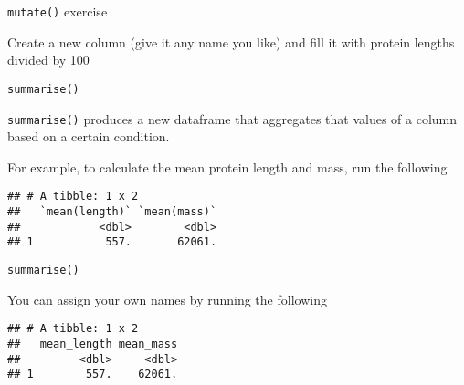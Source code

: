 \documentclass[ignorenonframetext,]{beamer}
\newenvironment{Shaded}{\begin{snugshade}}{\end{snugshade}}
\newcommand{\DataTypeTok}[1]{\textcolor[rgb]{0.13,0.29,0.53}{#1}}
\newcommand{\DecValTok}[1]{\textcolor[rgb]{0.00,0.00,0.81}{#1}}
\newcommand{\KeywordTok}[1]{\textcolor[rgb]{0.13,0.29,0.53}{\textbf{#1}}}
\newcommand{\NormalTok}[1]{#1}
\newcommand{\OperatorTok}[1]{\textcolor[rgb]{0.81,0.36,0.00}{\textbf{#1}}}
\newcommand{\StringTok}[1]{\textcolor[rgb]{0.31,0.60,0.02}{#1}}
\begin{document}
\begin{frame}[fragile]{\texttt{mutate()} exercise}
\protect\hypertarget{mutate-exercise}{}

Create a new column (give it any name you like) and fill it with protein
lengths divided by 100

\begin{Shaded}
\end{Shaded}

\end{frame}

\begin{frame}[fragile]{\texttt{summarise()}}
\protect\hypertarget{summarise}{}

\texttt{summarise()} produces a new dataframe that aggregates that
values of a column based on a certain condition.

For example, to calculate the mean protein length and mass, run the
following

\begin{Shaded}
\end{Shaded}

\begin{verbatim}
## # A tibble: 1 x 2
##   `mean(length)` `mean(mass)`
##            <dbl>        <dbl>
## 1           557.       62061.
\end{verbatim}

\end{frame}

\begin{frame}[fragile]{\texttt{summarise()}}
\protect\hypertarget{summarise-1}{}

You can assign your own names by running the following

\begin{Shaded}
\end{Shaded}

\begin{verbatim}
## # A tibble: 1 x 2
##   mean_length mean_mass
##         <dbl>     <dbl>
## 1        557.    62061.
\end{verbatim}

\end{frame}
\end{document}
